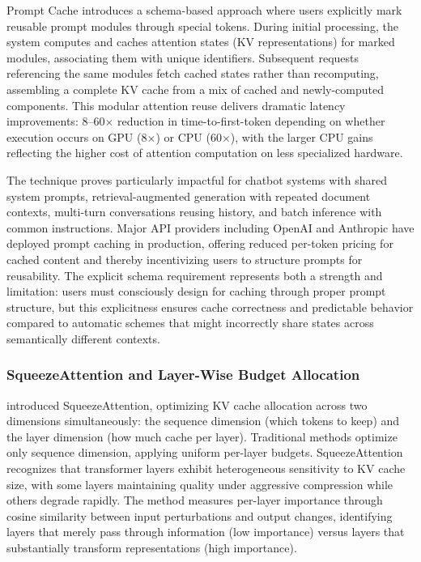 \documentclass[11pt,letterpaper]{article}
\begin{document}
Prompt Cache introduces a schema-based approach where users explicitly mark reusable prompt modules through special tokens. During initial processing, the system computes and caches attention states (KV representations) for marked modules, associating them with unique identifiers. Subsequent requests referencing the same modules fetch cached states rather than recomputing, assembling a complete KV cache from a mix of cached and newly-computed components. This modular attention reuse delivers dramatic latency improvements: 8--60$\times$ reduction in time-to-first-token depending on whether execution occurs on GPU (8$\times$) or CPU (60$\times$), with the larger CPU gains reflecting the higher cost of attention computation on less specialized hardware.

The technique proves particularly impactful for chatbot systems with shared system prompts, retrieval-augmented generation with repeated document contexts, multi-turn conversations reusing history, and batch inference with common instructions. Major API providers including OpenAI and Anthropic have deployed prompt caching in production, offering reduced per-token pricing for cached content and thereby incentivizing users to structure prompts for reusability. The explicit schema requirement represents both a strength and limitation: users must consciously design for caching through proper prompt structure, but this explicitness ensures cache correctness and predictable behavior compared to automatic schemes that might incorrectly share states across semantically different contexts.

\subsubsection{SqueezeAttention and Layer-Wise Budget Allocation}

\cite{li2024squeezeattention} introduced SqueezeAttention, optimizing KV cache allocation across two dimensions simultaneously: the sequence dimension (which tokens to keep) and the layer dimension (how much cache per layer). Traditional methods optimize only sequence dimension, applying uniform per-layer budgets. SqueezeAttention recognizes that transformer layers exhibit heterogeneous sensitivity to KV cache size, with some layers maintaining quality under aggressive compression while others degrade rapidly. The method measures per-layer importance through cosine similarity between input perturbations and output changes, identifying layers that merely pass through information (low importance) versus layers that substantially transform representations (high importance).
\end{document}
